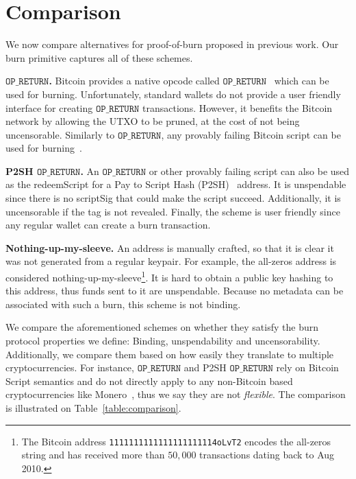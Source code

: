 \section{Comparison}

We now compare alternatives for proof-of-burn proposed in previous work. Our burn primitive captures all of these schemes.

\newcommand{\opreturn}{\texttt{OP\_RETURN}}

\noindent
\textbf{$\opreturn$.}
Bitcoin provides a native opcode called  $\opreturn$~\cite{opreturn} which can be used for burning.
Unfortunately,
standard wallets do not provide a user friendly interface for creating $\opreturn$ transactions.
However, it benefits the Bitcoin network by allowing the UTXO to be pruned, at
the cost of not being uncensorable.
Similarly to $\opreturn$, any provably failing Bitcoin script can be used for
burning~\cite{stewart}.

\noindent
\textbf{P2SH $\opreturn$.}
An $\opreturn$ or other provably failing script can also be used as the redeemScript for a Pay to Script Hash (P2SH)~\cite{p2sh} address. It is unspendable since there is no scriptSig that could make the script succeed. Additionally, it is uncensorable if the tag is not revealed. Finally, the scheme is user friendly since any regular wallet can create a burn transaction.

\noindent
\textbf{Nothing-up-my-sleeve.}
An address is manually crafted, so that it is clear it was not generated from a regular keypair. For example, the all-zeros address is considered nothing-up-my-sleeve\footnote{The Bitcoin address \texttt{1111111111111111111114oLvT2} encodes the all-zeros string and has received more than $50{,}000$ transactions dating back to Aug 2010.}. It is hard to obtain a public key hashing to this address, thus funds sent to it are unspendable. Because no metadata can be associated with such a burn, this scheme is not binding.

We compare the aforementioned schemes on whether they satisfy the burn protocol properties we define: Binding, unspendability and uncensorability. Additionally, we compare them based on how easily they translate to multiple cryptocurrencies. For instance, $\opreturn$ and P2SH $\opreturn$ rely on Bitcoin Script semantics and do not directly apply to any non-Bitcoin based cryptocurrencies like Monero~\cite{cryptonote}, thus we say they are not \emph{flexible}. The comparison is illustrated on Table~\ref{table:comparison}.

